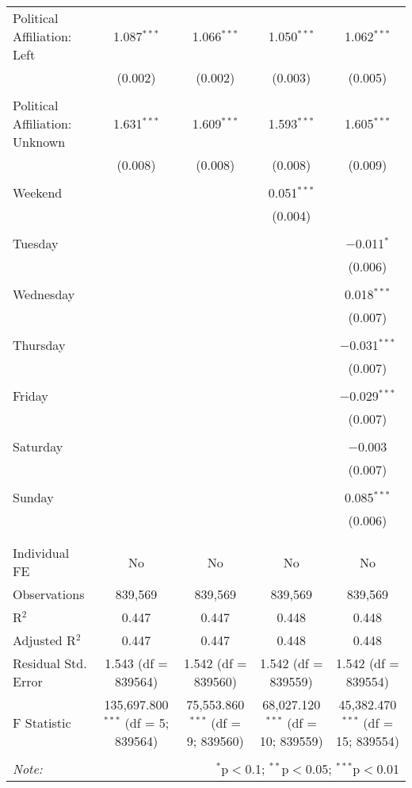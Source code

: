 \documentclass[
]{article}
\begin{document}
\begin{table}[!htbp]
{\begin{tabular}{@{\extracolsep{5pt}}lcccc}
 Political Affiliation: Left & 1.087$^{***}$ & 1.066$^{***}$ & 1.050$^{***}$ & 1.062$^{***}$ \\ 
  & (0.002) & (0.002) & (0.003) & (0.005) \\ 
  & & & & \\ 
 Political Affiliation: Unknown & 1.631$^{***}$ & 1.609$^{***}$ & 1.593$^{***}$ & 1.605$^{***}$ \\ 
  & (0.008) & (0.008) & (0.008) & (0.009) \\ 
  & & & & \\ 
 Weekend &  &  & 0.051$^{***}$ &  \\ 
  &  &  & (0.004) &  \\ 
  & & & & \\ 
 Tuesday &  &  &  & $-$0.011$^{*}$ \\ 
  &  &  &  & (0.006) \\ 
  & & & & \\ 
 Wednesday &  &  &  & 0.018$^{***}$ \\ 
  &  &  &  & (0.007) \\ 
  & & & & \\ 
 Thursday &  &  &  & $-$0.031$^{***}$ \\ 
  &  &  &  & (0.007) \\ 
  & & & & \\ 
 Friday &  &  &  & $-$0.029$^{***}$ \\ 
  &  &  &  & (0.007) \\ 
  & & & & \\ 
 Saturday &  &  &  & $-$0.003 \\ 
  &  &  &  & (0.007) \\ 
  & & & & \\ 
 Sunday &  &  &  & 0.085$^{***}$ \\ 
  &  &  &  & (0.006) \\ 
  & & & & \\ 
\hline \\[-1.8ex] 
Individual FE & No & No & No & No \\ 
Observations & 839,569 & 839,569 & 839,569 & 839,569 \\ 
R$^{2}$ & 0.447 & 0.447 & 0.448 & 0.448 \\ 
Adjusted R$^{2}$ & 0.447 & 0.447 & 0.448 & 0.448 \\ 
Residual Std. Error & 1.543 (df = 839564) & 1.542 (df = 839560) & 1.542 (df = 839559) & 1.542 (df = 839554) \\ 
F Statistic & 135,697.800$^{***}$ (df = 5; 839564) & 75,553.860$^{***}$ (df = 9; 839560) & 68,027.120$^{***}$ (df = 10; 839559) & 45,382.470$^{***}$ (df = 15; 839554) \\ 
\hline 
\hline \\[-1.8ex] 
\textit{Note:}  & \multicolumn{4}{r}{$^{*}$p$<$0.1; $^{**}$p$<$0.05; $^{***}$p$<$0.01} \\ 
\end{tabular}
} 
\end{table} 
\newpage
\end{document}
